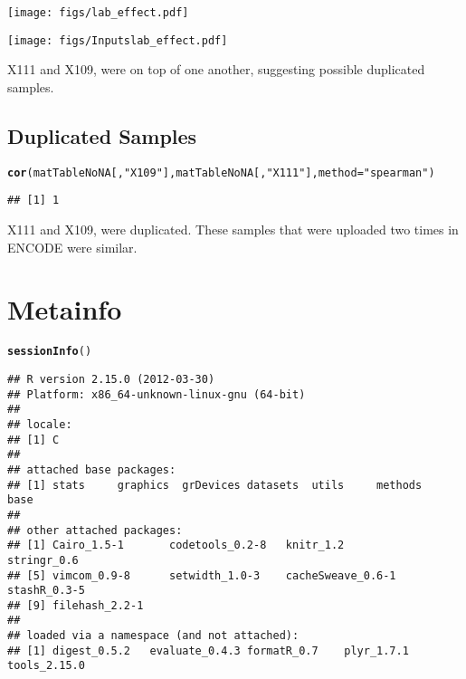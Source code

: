 \documentclass{article}\usepackage{graphicx, color}
\makeatletter
\newcommand{\hlfunctioncall}[1]{\textcolor[rgb]{0.501960784313725,0,0.329411764705882}{\textbf{#1}}}%
\newcommand{\hlstring}[1]{\textcolor[rgb]{0.6,0.6,1}{#1}}%
\newenvironment{kframe}{%
 \def\at@end@of@kframe{}%
 \ifinner\ifhmode%
  \def\at@end@of@kframe{\end{minipage}}%
  \begin{minipage}{\columnwidth}%
 \fi\fi%
 \def\FrameCommand##1{\hskip\@totalleftmargin \hskip-\fboxsep
 \colorbox{shadecolor}{##1}\hskip-\fboxsep
     \hskip-\linewidth \hskip-\@totalleftmargin \hskip\columnwidth}%
 \MakeFramed {\advance\hsize-\width
   \@totalleftmargin\z@ \linewidth\hsize
   \@setminipage}}%
 {\par\unskip\endMakeFramed%
 \at@end@of@kframe}
\newenvironment{knitrout}{}{} %
\makeatother
\begin{document}
\begin{figure*}
  \texttt{[image: figs/lab\_effect.pdf]}
\end{figure*}
\pagebreak

\begin{figure*}
  \texttt{[image: figs/Inputslab\_effect.pdf]}
\end{figure*}
\pagebreak

X111 and X109, were on top of one another, suggesting possible duplicated samples.

\subsection{Duplicated Samples}
\begin{knitrout}
\color{fgcolor}\begin{kframe}
\begin{alltt}
\hlfunctioncall{cor}(matTableNoNA[, \hlstring{"X109"}], matTableNoNA[, \hlstring{"X111"}], method = \hlstring{"spearman"})
\end{alltt}
\begin{verbatim}
## [1] 1
\end{verbatim}
\end{kframe}
\end{knitrout}


X111 and X109, were duplicated. These samples that were uploaded two times in ENCODE were similar.

\section{Metainfo}
\begin{knitrout}
\color{fgcolor}\begin{kframe}
\begin{alltt}
\hlfunctioncall{sessionInfo}()
\end{alltt}
\begin{verbatim}
## R version 2.15.0 (2012-03-30)
## Platform: x86_64-unknown-linux-gnu (64-bit)
## 
## locale:
## [1] C
## 
## attached base packages:
## [1] stats     graphics  grDevices datasets  utils     methods   base     
## 
## other attached packages:
## [1] Cairo_1.5-1       codetools_0.2-8   knitr_1.2         stringr_0.6      
## [5] vimcom_0.9-8      setwidth_1.0-3    cacheSweave_0.6-1 stashR_0.3-5     
## [9] filehash_2.2-1   
## 
## loaded via a namespace (and not attached):
## [1] digest_0.5.2   evaluate_0.4.3 formatR_0.7    plyr_1.7.1     tools_2.15.0
\end{verbatim}
\end{kframe}
\end{knitrout}
\end{document}
